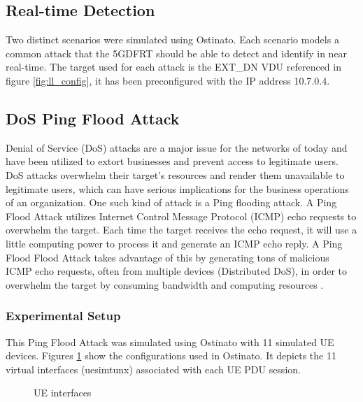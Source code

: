 \documentclass[final,1p,times,authoryear]{elsarticle}
\begin{document}
\subsection{Real-time Detection}
\label{sub4sec1}
Two distinct scenarios were simulated using Ostinato. Each scenario models a common attack that the 5GDFRT should be able to detect and identify in near real-time. The target used for each attack is the EXT\_DN VDU referenced in figure  \ref{fig:ll_config}, it has been preconfigured with the IP address 10.7.0.4.

\subsection{DoS Ping Flood Attack}
\label{sub4sub1}
Denial of Service (DoS) attacks are a major issue for the networks of today and have been utilized to extort businesses and prevent access to legitimate users. DoS attacks overwhelm their target's resources and render them unavailable to legitimate users, which can have serious implications for the business operations of an organization. One such kind of attack is a Ping flooding attack. A Ping Flood Attack utilizes Internet Control Message Protocol (ICMP) echo requests to overwhelm the target. Each time the target receives the echo request, it will use a little computing power to process it and generate an ICMP echo reply. A Ping Flood Flood Attack takes advantage of this by generating tons of malicious ICMP echo requests, often from multiple devices (Distributed DoS), in order to overwhelm the target by consuming bandwidth and computing resources \citep{kumar2006ping}.\\

\subsubsection{Experimental Setup}
\label{sub4sub1sec1}
This Ping Flood Attack was simulated using Ostinato with 11 simulated UE devices. Figures \ref{fig:port-group} show the configurations used in Ostinato. It depicts the 11 virtual interfaces (uesimtunx) associated with each UE PDU session.

\begin{figure}[H]
  \centering
  \caption{UE interfaces}
  \label{fig:port-group}
\end{figure}
\end{document}
